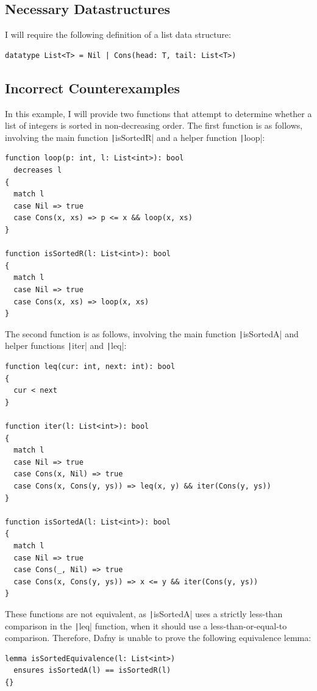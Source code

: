 \subsection{Necessary Datastructures}

I will require the following definition of a list data structure:
\begin{verbatim}
datatype List<T> = Nil | Cons(head: T, tail: List<T>)
\end{verbatim}

\subsection{Incorrect Counterexamples}\label{sec:counterexamples} 
In this example, I will provide two functions that attempt to determine whether a list of integers is sorted in non-decreasing order. The first function is as follows, involving the main function \texttt|isSortedR| and a helper function \texttt|loop|:

\begin{verbatim}
function loop(p: int, l: List<int>): bool
  decreases l
{
  match l
  case Nil => true
  case Cons(x, xs) => p <= x && loop(x, xs)
}

function isSortedR(l: List<int>): bool
{
  match l
  case Nil => true
  case Cons(x, xs) => loop(x, xs)
}
\end{verbatim}
%
The second function is as follows, involving the main function \texttt|isSortedA| and helper functions \texttt|iter| and \texttt|leq|:

\begin{verbatim}
function leq(cur: int, next: int): bool
{
  cur < next
}

function iter(l: List<int>): bool
{
  match l
  case Nil => true
  case Cons(x, Nil) => true
  case Cons(x, Cons(y, ys)) => leq(x, y) && iter(Cons(y, ys))
}

function isSortedA(l: List<int>): bool
{
  match l
  case Nil => true
  case Cons(_, Nil) => true
  case Cons(x, Cons(y, ys)) => x <= y && iter(Cons(y, ys))
}
\end{verbatim}
%
These functions are not equivalent, as \texttt|isSortedA| uses a strictly less-than comparison in the \texttt|leq| function, when it should use a less-than-or-equal-to comparison. Therefore, Dafny is unable to prove the following equivalence lemma:
\begin{verbatim}
lemma isSortedEquivalence(l: List<int>)
  ensures isSortedA(l) == isSortedR(l)
{}
\end{verbatim}
%

